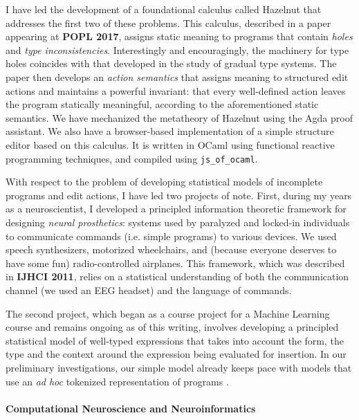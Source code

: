 \documentclass[9pt]{extarticle}
\let\li\lstinline
\begin{document}
I have led the development of a foundational calculus called Hazelnut that addresses the first two of these problems. This calculus, described in a paper appearing at \textbf{POPL 2017}, assigns static meaning to programs that contain \emph{holes} and \emph{type inconsistencies}. Interestingly and encouragingly, the machinery for type holes coincides with that developed in the study of gradual type systems. The paper then develops an \emph{action semantics} that assigns meaning to structured edit actions and maintains a powerful invariant: that every well-defined action leaves the program statically meaningful, according to the aforementioned static semantics. We have mechanized the metatheory of Hazelnut using the Agda proof assistant. We also have a browser-based implementation of a simple {structure editor} based on this calculus. It is written in OCaml using functional reactive programming techniques, and compiled using \li{js_of_ocaml}.

With respect to the problem of developing statistical models of incomplete programs and edit actions, I have led two projects of note. 
First, during my years as a neuroscientist, I developed a principled information theoretic framework for designing \emph{neural prosthetics}:  systems used by paralyzed and locked-in individuals to communicate commands (i.e. simple programs) to various devices. We used speech synthesizers, motorized wheelchairs, and (because everyone deserves to have some fun) radio-controlled airplanes. This framework, which was described in \textbf{IJHCI 2011}, relies on a statistical understanding of both the communication channel (we used an EEG headset) and  the language of commands.

The second project, which began as a course project for a Machine Learning course and remains ongoing as of this writing, involves developing a principled statistical model of well-typed expressions that takes into account the form, the type and the context around the expression being evaluated for insertion. In our preliminary investigations, our simple model already keeps pace with models that use an \emph{ad hoc} tokenized representation of programs \cite{icse-naturalness12}.

\vspace{-8px}
\paragraph{Computational Neuroscience and Neuroinformatics}
\end{document}
